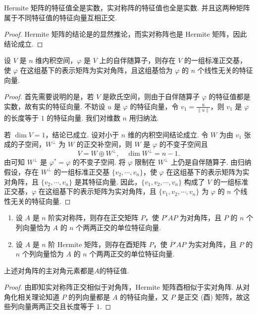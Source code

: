 \documentclass[../../main.tex]{subfiles}
\begin{document}
\begin{corollary}\label{corollary:Hermite矩阵和实对称矩阵关于特征值的相关性质}
Hermite 矩阵的特征值全是实数，实对称阵的特征值也全是实数. 并且这两种矩阵属于不同特征值的特征向量互相正交.
\end{corollary}
\begin{proof}
Hermite 矩阵的结论是的显然推论，而实对称阵也是 Hermite 矩阵，因此结论成立.

\end{proof}

\begin{theorem}\label{theorem:关于自伴随算子正交对角化}
设 $V$ 是 $n$ 维内积空间，$\varphi$ 是 $V$ 上的自伴随算子，则存在 $V$ 的一组标准正交基，使 $\varphi$ 在这组基下的表示矩阵为实对角阵，且这组基恰为 $\varphi$ 的 $n$ 个线性无关的特征向量.
\end{theorem}
\begin{proof}
首先需要说明的是，若 $V$ 是欧氏空间，则由于自伴随算子 $\varphi$ 的特征值都是实数，故有实的特征向量. 不妨设 $u$ 是 $\varphi$ 的特征向量，令 $v_1 = \frac{u}{\|u\|}$，则 $v_1$ 是 $\varphi$ 的长度等于 $1$ 的特征向量. 我们对维数 $n$ 用归纳法.

若 $\dim V = 1$，结论已成立. 设对小于 $n$ 维的内积空间结论成立. 令 $W$ 为由 $v_1$ 张成的子空间，$W^\perp$ 为 $W$ 的正交补空间，则 $W$ 是 $\varphi$ 的不变子空间且
\[
V = W \oplus W^\perp, \quad \dim W^\perp = n - 1.
\]
由可知 $W^\perp$ 是 $\varphi^* = \varphi$ 的不变子空间. 将 $\varphi$ 限制在 $W^\perp$ 上仍是自伴随算子. 由归纳假设，存在 $W^\perp$ 的一组标准正交基 $\{v_2,\cdots,v_n\}$，使 $\varphi$ 在这组基下的表示矩阵为实对角阵，且 $\{v_2,\cdots,v_n\}$ 是其特征向量. 因此，$\{v_1,v_2,\cdots,v_n\}$ 构成了 $V$ 的一组标准正交基，$\varphi$ 在这组基下的表示矩阵为实对角阵，且 $\{v_1,v_2,\cdots,v_n\}$ 为 $\varphi$ 的 $n$ 个线性无关的特征向量.

\end{proof}

\begin{theorem}\label{theorem:实对称和Hermite矩阵的正交对角化}
\begin{enumerate}
\item 设 $A$ 是 $n$ 阶实对称阵，则存在正交矩阵 $P$，使 $P'AP$ 为对角阵，且 $P$ 的 $n$ 个列向量恰为 $A$ 的 $n$ 个两两正交的单位特征向量.

\item 设 $A$ 是 $n$ 阶 Hermite 矩阵，则存在酉矩阵 $P$，使 $\overline{P}'AP$ 为实对角阵，且 $P$ 的 $n$ 个列向量恰为 $A$ 的 $n$ 个两两正交的单位特征向量.
\end{enumerate}
\end{theorem}
\begin{remark}
上述对角阵的主对角元素都是$A$的特征值.
\end{remark}
\begin{proof}
由即知实对称阵正交相似于对角阵，Hermite 矩阵酉相似于实对角阵. 从对角化相关理论知道 $P$ 的列向量都是 $A$ 的特征向量，又 $P$ 是正交 (酉) 矩阵，故这些列向量两两正交且长度等于 $1$. 

\end{proof}
\end{document}
